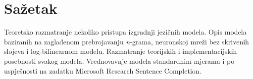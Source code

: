 \documentclass[times, utf8, diplomski, numeric]{fer}
\begin{document}



\chapter{Sažetak}

Teoretsko razmatranje nekoliko pristupa izgradnji jezičnih modela. Opis modela baziranih na zaglađenom prebrojavanju \textit{n}-grama, neuronskoj mreži bez skrivenih slojeva i log-bilinearnom modelu. Razmatranje teorijskih i implementacijskih posebnosti svakog modela. Vrednovavnje modela standardnim mjerama i po uspješnosti na zadatku Microsoft Research Sentence Completion.
\end{document}
